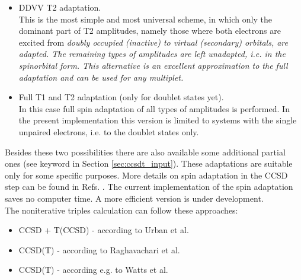 \begin{itemize}
\item {} DDVV T2 adaptation. \\
This is the most simple and most universal scheme, in which only the dominant
part of T2 amplitudes, namely those where both electrons are excited from \it
doubly occupied (inactive) \rm to \it virtual (secondary) \rm orbitals, are adapted.
The remaining types of amplitudes are left unadapted, i.e. in the spinorbital form.
This alternative is an excellent approximation to the full adaptation and
can be used for any multiplet.

\item {} Full T1 and T2 adaptation (only for doublet states yet).\\
In this case full spin adaptation of all types of amplitudes is performed.
In the present implementation this version is limited to systems with
the single unpaired electrons, i.e. to the doublet states only.
\end{itemize}

Besides these two possibilities there are also available some
additional partial ones (see keyword
 in Section \ref{sec:ccsdt_input}). These adaptations are
suitable only for some specific purposes. More details on spin adaptation in
the CCSD step can be found in Refs. \cite{ccsd_neo1,ccsd_neo2,ccsd_kno}.
The current implementation of the spin adaptation saves no computer time. A more
efficient version is under development.\\
The noniterative triples calculation can follow these approaches:

\begin{itemize}
\item CCSD + T(CCSD) - according to Urban et al. \cite{t3_urban}
\item CCSD(T) - according to Raghavachari et al. \cite{t3_ragh}
\item CCSD(T) - according e.g. to Watts et al. \cite{t3_watts}
\end{itemize}

